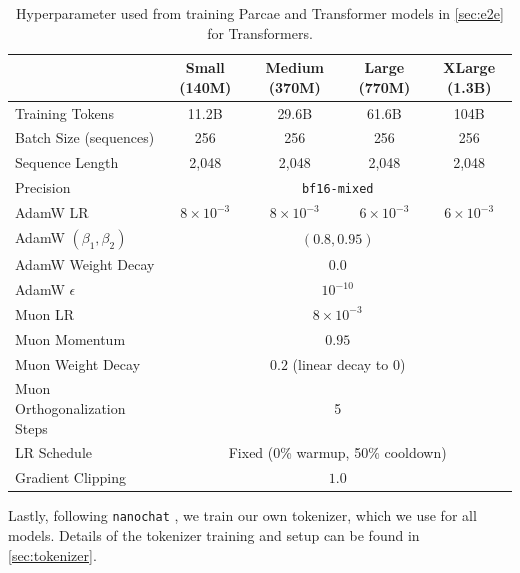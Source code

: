 \begin{table}[h]
  \centering
  \small
  \begin{tabular}{lcccc}
  \toprule
      & Small (140M) & Medium (370M) & Large (770M) & XLarge (1.3B) \\
  \midrule
      Training Tokens
          & 11.2B & 29.6B & 61.6B & 104B \\
      Batch Size (sequences)
          & 256 & 256 & 256 & 256 \\
      Sequence Length
          & 2{,}048 & 2{,}048 & 2{,}048 & 2{,}048 \\
      Precision
          & \multicolumn{4}{c}{\texttt{bf16-mixed}} \\
  \midrule
      AdamW LR
          & $8 \times 10^{-3}$ & $8 \times 10^{-3}$ & $6 \times 10^{-3}$ & $6 \times 10^{-3}$ \\
      AdamW $(\beta_1, \beta_2)$
          & \multicolumn{4}{c}{$(0.8, 0.95)$} \\
      AdamW Weight Decay
          & \multicolumn{4}{c}{$0.0$} \\
      AdamW $\epsilon$
          & \multicolumn{4}{c}{$10^{-10}$} \\
  \midrule
      Muon LR
          & \multicolumn{4}{c}{$8 \times 10^{-3}$} \\
      Muon Momentum
          & \multicolumn{4}{c}{$0.95$} \\
      Muon Weight Decay
          & \multicolumn{4}{c}{$0.2$ (linear decay to 0)} \\
      Muon Orthogonalization Steps
          & \multicolumn{4}{c}{5} \\
  \midrule
      LR Schedule
          & \multicolumn{4}{c}{Fixed (0\% warmup, 50\% cooldown)} \\
      Gradient Clipping
          & \multicolumn{4}{c}{$1.0$} \\
  \bottomrule
  \end{tabular}
  \caption{Hyperparameter used from training Parcae and Transformer models in \cref{sec:e2e} for Transformers.}
  \label{tab:transformer-parcae-hyperparameters}
\end{table}



Lastly, following \texttt{nanochat} \citep{nanochat}, we train our own tokenizer, which we use for all models. Details of the tokenizer training and setup can be found in \cref{sec:tokenizer}.

